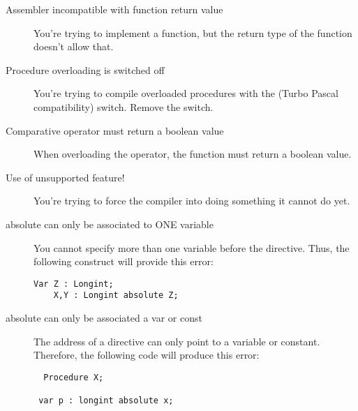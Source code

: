 \documentclass{report}
\begin{document}
\begin{description}
\item [ Assembler incompatible with function return value ]
You're trying to implement a  function, but the return type
of the function doesn't allow that.
\item [ Procedure overloading is switched off ]
You're trying to compile overloaded procedures with the  (Turbo Pascal
compatibility) switch. Remove the switch. 
\item [ Comparative operator must return a boolean value ]
When overloading the \var{=} operator, the function must return a boolean
value.
\item [ Use of unsupported feature! ]
You're trying to force the compiler into doing something it cannot do yet.
\item [ absolute can only be associated to ONE variable ]
You cannot specify more than one variable before the  directive.
Thus, the following construct will provide this error:
\begin{verbatim}
Var Z : Longint;
    X,Y : Longint absolute Z;
\end{verbatim}
\item [ absolute can only be associated a var or const ]
The address of a  directive can only point to a variable or
constant. Therefore, the following code will produce this error:
\begin{verbatim}
  Procedure X;

 var p : longint absolute x;
\end{verbatim}


\end{description}
\end{document}
